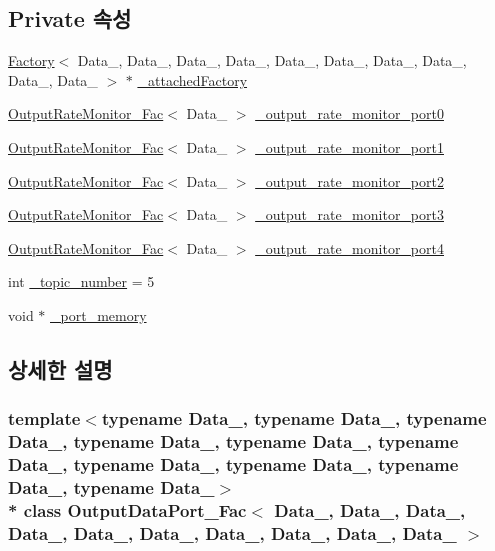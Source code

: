 \subsection*{Private 속성}
\begin{DoxyCompactItemize}
\item 
\hyperlink{classFactory}{Factory}$<$ Data\+\_, Data\+\_, Data\+\_, Data\+\_, Data\+\_, Data\+\_, Data\+\_, Data\+\_, Data\+\_, Data\+\_ $>$ $\ast$ \hyperlink{classOutputDataPort__Fac_a9c3ce9aadae7aef468d34d5a0e3156a3}{\+\_\+attached\+Factory}
\item 
\hyperlink{classOutputRateMonitor__Fac}{Output\+Rate\+Monitor\+\_\+\+Fac}$<$ Data\+\_ $>$ \hyperlink{classOutputDataPort__Fac_a85d54bb4480401d8d5d78281c39d8ac7}{\+\_\+output\+\_\+rate\+\_\+monitor\+\_\+port0}
\item 
\hyperlink{classOutputRateMonitor__Fac}{Output\+Rate\+Monitor\+\_\+\+Fac}$<$ Data\+\_ $>$ \hyperlink{classOutputDataPort__Fac_a79a7fb9b739aeab490bc361abc38b193}{\+\_\+output\+\_\+rate\+\_\+monitor\+\_\+port1}
\item 
\hyperlink{classOutputRateMonitor__Fac}{Output\+Rate\+Monitor\+\_\+\+Fac}$<$ Data\+\_ $>$ \hyperlink{classOutputDataPort__Fac_a9e9987fd7f06ad383659f5fa06ee5546}{\+\_\+output\+\_\+rate\+\_\+monitor\+\_\+port2}
\item 
\hyperlink{classOutputRateMonitor__Fac}{Output\+Rate\+Monitor\+\_\+\+Fac}$<$ Data\+\_ $>$ \hyperlink{classOutputDataPort__Fac_a1abe5426f02ff8a32b09925ef4b5dce2}{\+\_\+output\+\_\+rate\+\_\+monitor\+\_\+port3}
\item 
\hyperlink{classOutputRateMonitor__Fac}{Output\+Rate\+Monitor\+\_\+\+Fac}$<$ Data\+\_ $>$ \hyperlink{classOutputDataPort__Fac_af620f4f1d7863aafddbdfeb8665a4273}{\+\_\+output\+\_\+rate\+\_\+monitor\+\_\+port4}
\item 
int \hyperlink{classOutputDataPort__Fac_a2e344acab941f42e8ea0aaea28b5d00a}{\+\_\+topic\+\_\+number} = 5
\item 
void $\ast$ \hyperlink{classOutputDataPort__Fac_ac7d5619e0c34eaa1f1b29df8020e918e}{\+\_\+port\+\_\+memory}
\end{DoxyCompactItemize}


\subsection{상세한 설명}
\subsubsection*{template$<$typename Data\+\_, typename Data\+\_, typename Data\+\_, typename Data\+\_, typename Data\+\_, typename Data\+\_, typename Data\+\_, typename Data\+\_, typename Data\+\_, typename Data\+\_$>$\\*
class Output\+Data\+Port\+\_\+\+Fac$<$ Data\+\_, Data\+\_, Data\+\_, Data\+\_, Data\+\_, Data\+\_, Data\+\_, Data\+\_, Data\+\_, Data\+\_ $>$}



